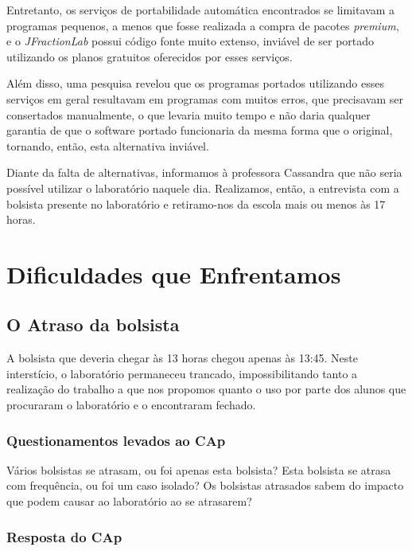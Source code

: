 Entretanto, os serviços de portabilidade automática encontrados se limitavam a programas pequenos, a menos que fosse realizada a compra de pacotes \textit{premium}, e o \textit{JFractionLab} possui código fonte muito extenso, inviável de ser portado utilizando os planos gratuitos oferecidos por esses serviços.

Além disso, uma pesquisa revelou que os programas portados utilizando esses serviços em geral resultavam em programas com muitos erros, que precisavam ser consertados manualmente, o que levaria muito tempo e não daria qualquer garantia de que o software portado funcionaria da mesma forma que o original, tornando, então, esta alternativa inviável.

Diante da falta de alternativas, informamos à professora Cassandra que não seria possível utilizar o laboratório naquele dia. Realizamos, então, a entrevista com a bolsista presente no laboratório e retiramo-nos da escola mais ou menos às 17 horas.

\section{Dificuldades que Enfrentamos}\label{sec:LABEL_CHP_REL_SEC_PROBS}

\subsection{O Atraso da bolsista}\label{sec:LABEL_CHP_REL_SEC_PROBS_SUBSEC_ATR}

A bolsista que deveria chegar às 13 horas chegou apenas às 13:45. Neste interstício, o laboratório permaneceu trancado, impossibilitando tanto a realização do trabalho a que nos propomos quanto o uso por parte dos alunos que procuraram o laboratório e o encontraram fechado.

\subsubsection{Questionamentos levados ao CAp}

Vários bolsistas se atrasam, ou foi apenas esta bolsista? Esta bolsista se atrasa com frequência, ou foi um caso isolado? Os bolsistas atrasados sabem do impacto que podem causar ao laboratório ao se atrasarem?

\subsubsection{Resposta do CAp}

